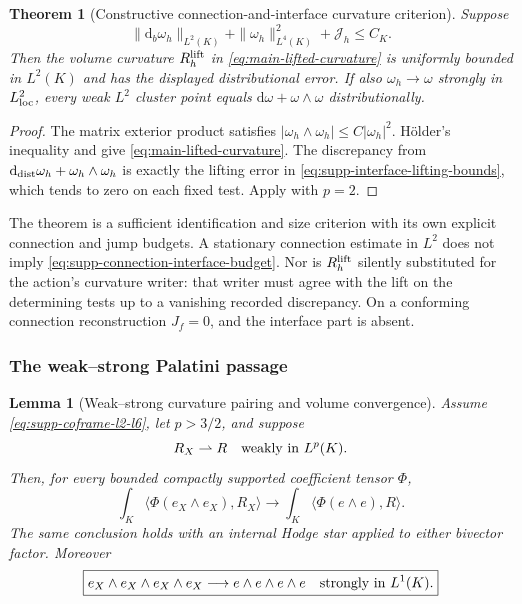 \documentclass[11pt]{article}
\newtheorem{theorem}{Theorem}[section]
\newtheorem{lemma}[lemma]{Lemma}
\theoremstyle{definition}
\theoremstyle{remark}
\newcommand{\dd}{\mathrm d}
\begin{document}
\begin{theorem}[Constructive connection-and-interface curvature criterion]
\label{thm:supp-interface-curvature}
Suppose
\begin{equation}
 \|\dd_b\omega_h\|_{L^2(K)}+\|\omega_h\|_{L^4(K)}^2+
       \mathcal J_h\le C_K.
 \label{eq:supp-connection-interface-budget}
\end{equation}
Then the volume curvature $R_h^{\rm lift}$ in
\eqref{eq:main-lifted-curvature} is uniformly bounded in $L^2(K)$ and has
the displayed distributional error.  If also
$\omega_h\to\omega$ strongly in $L^2_{\rm loc}$, every weak $L^2$ cluster
point equals $\dd\omega+\omega\wedge\omega$ distributionally.
\end{theorem}
\begin{proof}
The matrix exterior product satisfies
$|\omega_h\wedge\omega_h|\le C|\omega_h|^2$.  H\"older's inequality and
 give
\eqref{eq:main-lifted-curvature}.  The discrepancy from
$\dd_{\rm dist}\omega_h+\omega_h\wedge\omega_h$ is exactly the lifting
error in \eqref{eq:supp-interface-lifting-bounds}, which tends to zero on
each fixed test.  Apply  with $p=2$.
\end{proof}

The theorem is a sufficient identification and size criterion with its own
explicit connection and jump budgets.  A stationary connection estimate in
$L^2$ does not imply \eqref{eq:supp-connection-interface-budget}.
Nor is $R_h^{\rm lift}$ silently substituted for the action's curvature
writer: that writer must agree with the lift on the determining tests up to
a vanishing recorded discrepancy.  On a conforming connection reconstruction
$J_f=0$, and the interface part is absent.

\subsubsection{The weak--strong Palatini passage}

\begin{lemma}[Weak--strong curvature pairing and volume convergence]
\label{lem:supp-weak-strong-palatini}
Assume \eqref{eq:supp-coframe-l2-l6}, let $p>3/2$, and suppose
\begin{equation}
 R_X\rightharpoonup R\quad\hbox{weakly in }L^p(K).
 \label{eq:supp-curvature-weak}
\end{equation}
Then, for every bounded compactly supported coefficient tensor $\Phi$,
\begin{equation}
 \boxed{
 \int_K\!\langle\Phi(e_X\wedge e_X),R_X\rangle
 \longrightarrow
 \int_K\!\langle\Phi(e\wedge e),R\rangle.}
 \label{eq:supp-weak-strong-pairing}
\end{equation}
The same conclusion holds with an internal Hodge star applied to either
bivector factor.  Moreover
\begin{equation}
 \boxed{
 e_X\wedge e_X\wedge e_X\wedge e_X
 \longrightarrow
 e\wedge e\wedge e\wedge e
 \quad\hbox{strongly in }L^1(K).}
 \label{eq:supp-volume-strong}
\end{equation}
\end{lemma}
\end{document}
